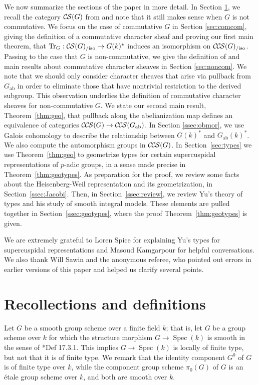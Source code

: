 \documentclass[10pt]{amsart}
\theoremstyle{plain}
\theoremstyle{definition}
\newcommand{\Fq}{k}
\newcommand{\Spec}[1]{{\operatorname{Spec}(#1)}}
\newcommand{\ab}{_{\operatorname{ab}}}
\DeclareMathOperator{\Tr}{Tr}
\newcommand{\TrFrob}[1]{\Tr_{#1}}
\newcommand{\CS}{{\mathcal{C\hskip-0.8pt S}}}
\newcommand{\CCS}{{\mathcal{C\hskip-.8pt C\hskip-0.8pt S}}}
\newcommand{\CSiso}[1]{\CS(#1)_{/\text{iso}}}
\newcommand{\CCSiso}[1]{\CCS(#1)_{/\text{iso}}}
\begin{document}
We now summarize the sections of the paper in more detail.
In Section \ref{sec:defs}, we recall the category $\CS(G)$ from \cite{cunningham-roe:13a} and note that it still makes sense when $G$ is not commutative.  
We focus on the case of commutative $G$ in Section \ref{sec:comcom},
giving the definition of a commutative character sheaf and proving our first main theorem, that
$\TrFrob{G} : \CSiso{G} \to G(k)^*$ induces an isomorphism on $\CCSiso{G}$.
Passing to the case that $G$ is non-commutative, we give the definition of and main results about commutative character sheaves in Section \ref{sec:noncom}.  
We note that we should only consider character sheaves that arise via pullback from $G\ab$ in order to eliminate those that have nontrivial restriction to the derived subgroup.  
This observation underlies the definition of commutative character sheaves for non-commutative $G$.  
We state our second main result, Theorem~\ref{thm:geo}, that pullback along the abelianization map defines an equivalence of categories $\CCS(G) \to \CCS(G\ab)$.
In Section \ref{ssec:obmor}, we use Galois cohomology to describe the relationship between $G(k)^*$ and $G\ab(k)^*$.  
We also compute the automorphism groups in $\CCS(G)$.
In Section~\ref{sec:types} we use Theorem~\ref{thm:geo} to geometrize types for certain supercuspidal representations of $p$-adic groups, in a sense made precise in Theorem~\ref{thm:geotypes}.
As preparation for the proof, we review some facts about the Heisenberg-Weil representation and its geometrization, in Section~\ref{ssec:Jacobi}.
Then, in Section~\ref{ssec:review}, we review Yu's theory of types and his study of smooth integral models.  
These elements are pulled together in Section~\ref{ssec:geotypes}, where the proof Theorem~\ref{thm:geotypes} is given.



\bigskip

We are extremely grateful to Loren Spice for explaining Yu's types for supercuspidal representations and Masoud Kamgarpour for helpful conversations.
We also thank Will Sawin and the anonymous referee, who pointed out errors in earlier versions of this paper and helped us clarify several points.

\section{Recollections and definitions} \label{sec:defs}

Let $G$ be a smooth group scheme over a finite field $\Fq$; that is, let $G$ be a group scheme over $\Fq$
for which the structure morphism $G \to \Spec{\Fq}$ is smooth in the sense of \cite{EGAIV4}*{Def 17.3.1}.
This implies $G \to \Spec{\Fq}$ is locally of finite type, but not that it is of finite type.
We remark that the identity component $G^0$ of $G$ is of finite type over $\Fq$, while the component group scheme
$\pi_0(G)$ of $G$ is an \'etale group scheme over $\Fq$, and both are smooth over $\Fq$.
\end{document}
